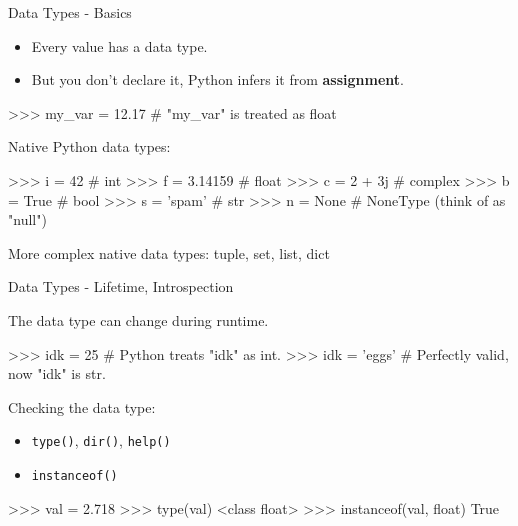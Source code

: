 \documentclass[10pt]{beamer}
\begin{document}
\begin{frame}[fragile]{Data Types - Basics}
\begin{itemize}
\item  Every value has a data type.
\item  But you don't declare it, Python infers it from \textbf{assignment}.
\end{itemize}

\begin{pythoncode}
>>> my_var = 12.17   # "my_var" is treated as float
\end{pythoncode}


Native Python data types:

\begin{pythoncode}
>>> i = 42      # int
>>> f = 3.14159 # float
>>> c = 2 + 3j  # complex
>>> b = True    # bool
>>> s = 'spam'  # str
>>> n = None    # NoneType (think of as "null")
\end{pythoncode}


More complex native data types: tuple, set, list, dict
\end{frame}

\begin{frame}[fragile]{Data Types - Lifetime, Introspection}


The data type can change during runtime.


\begin{pythoncode}
>>>  idk = 25      # Python treats "idk" as int.
>>>  idk = 'eggs'  # Perfectly valid, now "idk" is str.
\end{pythoncode}


Checking the data type:
\begin{itemize}
\item  \small{\texttt{type()}, \texttt{dir()}, \texttt{help()}}
\item  \small{\texttt{instanceof()}}
\end{itemize}


\begin{pythoncode}
>>> val = 2.718
>>> type(val)
<class float>
>>> instanceof(val, float)
True
\end{pythoncode}
\end{frame}


\end{document}
